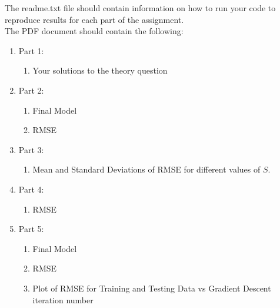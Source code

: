 \documentclass[12pt]{article}
\begin{document}
\noindent
The readme.txt file should contain information on how to run your code to reproduce results for each part of the assignment.\\

\noindent
The PDF document should contain the following:

\begin{enumerate}
\item Part 1:
	\begin{enumerate}
	\item Your solutions to the theory question
	\end{enumerate}
\item Part 2:
	\begin{enumerate}
	\item Final Model
	\item RMSE
	\end{enumerate}
\item Part 3:
	\begin{enumerate}
	\item Mean and Standard Deviations of RMSE for different values of $S$.
	\end{enumerate}
\item Part 4:
	\begin{enumerate}
	\item RMSE
	\end{enumerate}	
\item Part 5:
	\begin{enumerate}
	\item Final Model
	\item RMSE
	\item Plot of RMSE for Training and Testing Data vs Gradient Descent iteration number
	\end{enumerate}
\end{enumerate}
\end{document}
